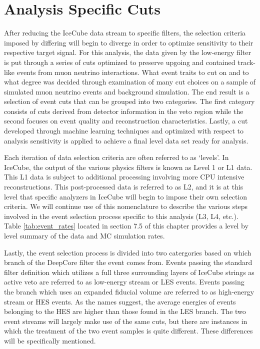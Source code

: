 \documentclass{gatech-thesis}
\begin{document}
\section{Analysis Specific Cuts}
After reducing the IceCube data stream to specific filters, the selection criteria imposed by differing will begin to diverge in order to optimize sensitivity to their respective target signal. For this analysis, the data given by the low-energy filter is put through a series of cuts optimized to preserve upgoing and contained track-like events from muon neutrino interactions. What event traits to cut on and to what degree was decided through examination of many cut choices on a sample of simulated muon neutrino events and background simulation. The end result is a selection of event cuts that can be grouped into two categories. The first category consists of cuts derived from detector information in the veto region while the second focuses on event quality and reconstruction characteristics. Lastly, a cut developed through machine learning techniques and optimized with respect to analysis sensitivity is applied to achieve a final level data set ready for analysis.

Each iteration of data selection criteria are often referred to as `levels'. In IceCube, the output of the various physics filters is known as Level 1 or L1 data. This L1 data is subject to additional processing involving more CPU intensive reconstructions. This post-processed data is referred to as L2, and it is at this level that specific analyzers in IceCube will begin to impose their own selection criteria. We will continue use of this nomenclature to describe the various steps involved in the event selection process specific to this analysis (L3, L4, etc.). Table \ref{tab:event_rates} located in section 7.5 of this chapter provides a level by level summary of the data and MC simulation rates.

Lastly, the event selection process is divided into two catergories based on which branch of the DeepCore filter the event comes from. Events passing the standard filter definition which utilizes a full three surrounding layers of IceCube strings as active veto are referred to as low-energy stream or LES events. Events passing the branch which uses an expanded fiducial volume are referred to as high-energy stream or HES events. As the names suggest, the average energies of events belonging to the HES are higher than those found in the LES branch. The two event streams will largely make use of the same cuts, but there are instances in which the treatment of the two event samples is quite different. These differences will be specifically mentioned.
\end{document}
